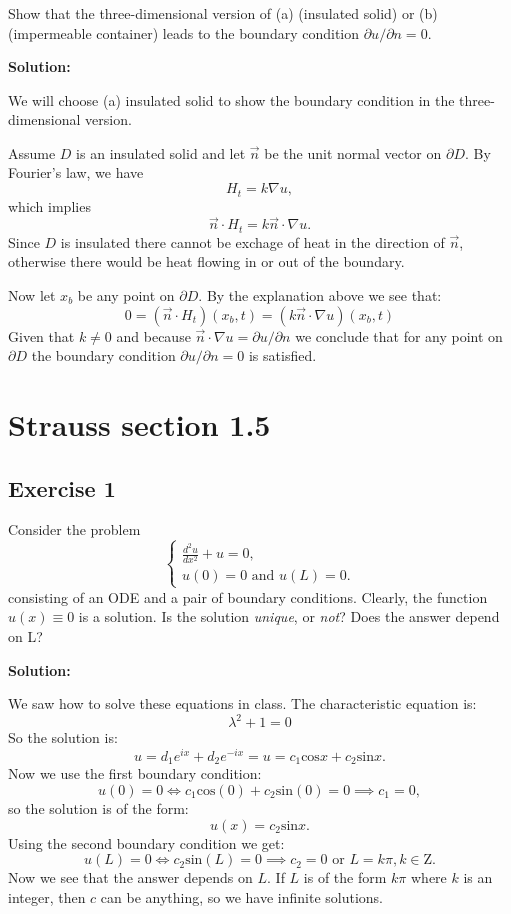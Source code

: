 \documentclass{article}
\begin{document}
	\subsubsection{}
Show that the three-dimensional version of (a) (insulated solid) or (b) (impermeable container) leads to the boundary condition $\partial u/ \partial n=0$.
		
\textbf{Solution:}

We will choose (a) insulated solid to show the boundary condition in the three-dimensional version.
	    
Assume $D$ is an insulated solid and let $\vec{n}$ be the unit normal vector on $\partial D$.
By Fourier's law, we have
\[
H_{t}= k \nabla u,
\]
which implies
\[
	\vec{n}\cdot H_{t}= k \vec{n}\cdot\nabla u.
\]
Since $D$ is insulated there cannot
be exchage of heat in the direction of $\vec{n}$, otherwise there would be heat
flowing in or out of the boundary.

Now let $x_b$ be any point on $\partial D$. By the explanation above we see that:
\[
	0=(\vec{n}\cdot H_t)(x_b,t)=(k \vec{n}\cdot\nabla u)(x_b,t)
\]
Given that $k\neq 0$ and because $\vec{n}\cdot \nabla u=\partial u /\partial n$
we conclude that for any point on $\partial D$ the boundary condition
$\partial u/\partial n=0$ is satisfied.

\section{Strauss section 1.5}
\subsection{Exercise 1}
Consider the problem
		\begin{equation*}
			\begin{cases}
				\frac{d^2u}{dx^2}+u = 0,
				\\
				u(0)=0 \text{ and } u(L)=0.
			\end{cases}
		\end{equation*}
		consisting of an ODE and a pair of boundary
		conditions. Clearly, the function $u(x) \equiv 0$ is a
		solution. Is the solution \textit{unique}, or \textit{not}?
	Does the answer depend on L?

	\textbf{Solution:}

		We saw how to solve these equations in class.
		The characteristic equation is:
		\[
			\lambda^2 +1=0
		\]
		So the solution is:
\[u = d_1e^{ix} + d_2e^{-ix} =u = c_1\text{cos}x +	c_2\text{sin}x.\]
		Now we use the first boundary condition:
		\[
			u(0)=0 \iff c_1\text{cos}(0) +
			c_2\text{sin}(0) = 0 \implies c_1=0,
	        \]
		so the solution is of the form:
		\[
			u(x)=c_{2}\text{sin}x.
		\]
		Using the second boundary condition we get:
		\[
			u(L)=0 \iff c_{2}\text{sin}(L) =0 \implies c_{2}=0 \text{ or } L=k\pi, k\in \mathrm{Z}.
		\]
		Now we see that the answer depends on $L$. If $L$ is of the form $k\pi$ where $k$ is an integer, then $c$ can be anything, so we have infinite solutions.
\end{document}

